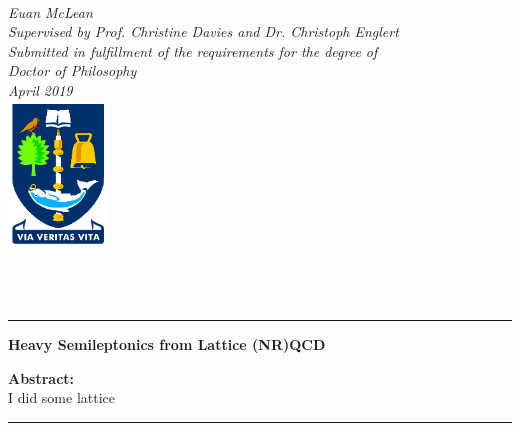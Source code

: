 \begin{titlepage}
\begin{center}
\vspace*{0.8cm}
 \\
\vspace*{0.5cm}
\noindent \LARGE \emph{Euan McLean} \\
\vspace*{1.3cm}
\noindent \large \emph{Supervised by Prof. Christine Davies and Dr. Christoph Englert} \\
\vspace*{0.8cm}
\noindent \large \emph{Submitted in fulfillment of the requirements for the degree of} \\
\vspace*{0.1cm}
\noindent \large \emph{Doctor of Philosophy} \\
\vspace*{0.8cm}
\noindent \large \emph{April 2019} \\
\vspace*{1.3cm}
\includegraphics[width=100px]{images/logo-glasgow-small.png}

\vspace*{0.3cm}

 \\
 \\


\end{center}

\cleardoublepage
\begin{vcenterpage}
\noindent\rule[2pt]{\textwidth}{0.5pt}
\begin{center}
{\large\textbf{Heavy Semileptonics from Lattice (NR)QCD}}
\end{center}
{\large\textbf{Abstract:}}
\\
I did some lattice
\\
\noindent\rule[2pt]{\textwidth}{0.5pt}
\end{vcenterpage}


\end{titlepage}

